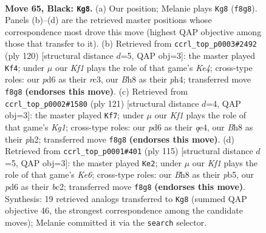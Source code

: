 \documentclass[11pt]{article}
\begin{document}
\clearpage

\begin{figure}[p]\centering
\begin{subfigure}{0.46\textwidth}\centering
\resizebox{\linewidth}{!}{%
\newchessgame
\chessboard[
  setfen={5k1b/5p2/3P4/1q6/8/7K/8/8 b - - 0 65},
  showmover=false,
  pgfstyle=straightmove, color=movearrow, markmove={f8-g8}
]}
\caption{}
\end{subfigure}\hfill
\begin{subfigure}{0.46\textwidth}\centering
\resizebox{\linewidth}{!}{%
\newchessgame
\chessboard[
  setfen={8/R7/8/5P2/4K2p/2r5/5k2/8 w - - 0 61},
  showmover=false,
  pgfstyle=straightmove, color=movearrow, markmove={e4-f4}
]}
\caption{}
\end{subfigure}
\\[4pt]
\begin{subfigure}{0.46\textwidth}\centering
\resizebox{\linewidth}{!}{%
\newchessgame
\chessboard[
  setfen={6k1/6p1/8/2q5/4Q3/8/7P/5K2 b - - 7 61},
  showmover=false,
  pgfstyle=straightmove, color=movearrow, markmove={g8-f7}
]}
\caption{}
\end{subfigure}\hfill
\begin{subfigure}{0.46\textwidth}\centering
\resizebox{\linewidth}{!}{%
\newchessgame
\chessboard[
  setfen={8/8/8/1P2K3/8/4k3/2Bp4/7b b - - 1 58},
  showmover=false,
  pgfstyle=straightmove, color=movearrow, markmove={e3-e2}
]}
\caption{}
\end{subfigure}
\caption{\textbf{Move 65, Black: \texttt{Kg8}.} (a) Our position; Melanie plays \texttt{Kg8} (\texttt{f8g8}). Panels (b)--(d) are the retrieved master positions whose correspondence most drove this move (highest QAP objective among those that transfer to it). (b) Retrieved from \texttt{ccrl\_top\_p0003\#2492} (ply 120) [structural distance $d$=5, QAP obj=3]: the master played \texttt{Kf4}; under $\mu$ our \emph{Kf1} plays the role of that game's \emph{Ke4}; cross-type roles: our \emph{p}d6 as their \emph{r}c3, our \emph{B}h8 as their \emph{p}h4; transferred move \texttt{f8g8} \textbf{(endorses this move)}. (c) Retrieved from \texttt{ccrl\_top\_p0002\#1580} (ply 121) [structural distance $d$=4, QAP obj=3]: the master played \texttt{Kf7}; under $\mu$ our \emph{Kf1} plays the role of that game's \emph{Kg1}; cross-type roles: our \emph{p}d6 as their \emph{q}e4, our \emph{B}h8 as their \emph{p}h2; transferred move \texttt{f8g8} \textbf{(endorses this move)}. (d) Retrieved from \texttt{ccrl\_top\_p0001\#401} (ply 115) [structural distance $d$=5, QAP obj=3]: the master played \texttt{Ke2}; under $\mu$ our \emph{Kf1} plays the role of that game's \emph{Ke6}; cross-type roles: our \emph{B}h8 as their \emph{p}b5, our \emph{p}d6 as their \emph{b}c2; transferred move \texttt{f8g8} \textbf{(endorses this move)}. Synthesis: 19 retrieved analogs transferred to \texttt{Kg8} (summed QAP objective 46, the strongest correspondence among the candidate moves); Melanie committed it via the \texttt{search} selector.}
\label{fig:thought-m129}
\end{figure}
\end{document}
